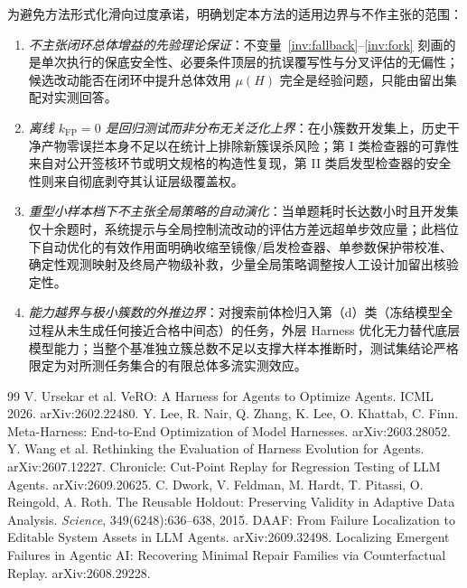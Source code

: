 \documentclass[UTF8,a4paper,10.5pt]{ctexart}
\begin{document}
为避免方法形式化滑向过度承诺，明确划定本方法的适用边界与不作主张的范围：
\begin{enumerate}
  \item \emph{不主张闭环总体增益的先验理论保证}：不变量~\ref{inv:fallback}--\ref{inv:fork} 刻画的是单次执行的保底安全性、必要条件顶层的抗误覆写性与分叉评估的无偏性；候选改动能否在闭环中提升总体效用 $\mu(H)$ 完全是经验问题，只能由留出集配对实测回答。
  \item \emph{离线 $k_{\mathrm{FP}}=0$ 是回归测试而非分布无关泛化上界}：在小簇数开发集上，历史干净产物零误拦本身不足以在统计上排除新簇误杀风险；第 I 类检查器的可靠性来自对公开签核环节或明文规格的构造性复现，第 II 类启发型检查器的安全性则来自彻底剥夺其认证层级覆盖权。
  \item \emph{重型小样本档下不主张全局策略的自动演化}：当单题耗时长达数小时且开发集仅十余题时，系统提示与全局控制流改动的评估方差远超单步效应量；此档位下自动优化的有效作用面明确收缩至镜像/启发检查器、单参数保护带校准、确定性观测映射及终局产物级补救，少量全局策略调整按人工设计加留出核验定性。
  \item \emph{能力越界与极小簇数的外推边界}：对搜索前体检归入第（d）类（冻结模型全过程从未生成任何接近合格中间态）的任务，外层 Harness 优化无力替代底层模型能力；当整个基准独立簇总数不足以支撑大样本推断时，测试集结论严格限定为对所测任务集合的有限总体多流实测效应。
\end{enumerate}

\begin{thebibliography}{99}\small
{} V. Ursekar et al. VeRO: A Harness for Agents to Optimize Agents. ICML 2026. arXiv:2602.22480.
 Y. Lee, R. Nair, Q. Zhang, K. Lee, O. Khattab, C. Finn. Meta-Harness: End-to-End Optimization of Model Harnesses. arXiv:2603.28052.
 Y. Wang et al. Rethinking the Evaluation of Harness Evolution for Agents. arXiv:2607.12227.
 Chronicle: Cut-Point Replay for Regression Testing of LLM Agents. arXiv:2609.20625.
 C. Dwork, V. Feldman, M. Hardt, T. Pitassi, O. Reingold, A. Roth. The Reusable Holdout: Preserving Validity in Adaptive Data Analysis. \emph{Science}, 349(6248):636--638, 2015.
 DAAF: From Failure Localization to Editable System Assets in LLM Agents. arXiv:2609.32498.
 Localizing Emergent Failures in Agentic AI: Recovering Minimal Repair Families via Counterfactual Replay. arXiv:2608.29228.
\end{thebibliography}
\end{document}
